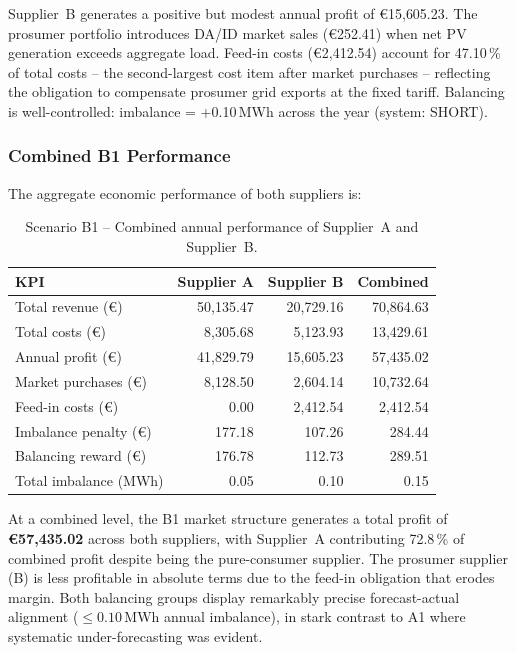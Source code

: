 Supplier~B generates a positive but modest annual profit of €15{,}605.23.
The prosumer portfolio introduces DA/ID market sales (€252.41) when net
PV generation exceeds aggregate load.  Feed-in costs (€2{,}412.54)
account for 47.10\,\% of total costs -- the second-largest cost item after
market purchases -- reflecting the obligation to compensate prosumer
grid exports at the fixed tariff.  Balancing is well-controlled:
imbalance = +0.10\,MWh across the year (system: SHORT).

\subsubsection{Combined B1 Performance}

The aggregate economic performance of both suppliers is:

\begin{table}[htbp]
\centering
\caption{Scenario B1 -- Combined annual performance of Supplier~A and
         Supplier~B.}
\label{tab:B1_combined}
\renewcommand{\arraystretch}{1.3}
\begin{tabular}{@{}lrrr@{}}
\toprule
\textbf{KPI}           & \textbf{Supplier A}  & \textbf{Supplier B}  & \textbf{Combined} \\
\midrule
Total revenue (€)      & 50{,}135.47          & 20{,}729.16          & 70{,}864.63 \\
Total costs (€)        & 8{,}305.68           & 5{,}123.93           & 13{,}429.61 \\
Annual profit (€)      & 41{,}829.79          & 15{,}605.23          & 57{,}435.02 \\
Market purchases (€)   & 8{,}128.50           & 2{,}604.14           & 10{,}732.64 \\
Feed-in costs (€)      & 0.00                 & 2{,}412.54           & 2{,}412.54  \\
Imbalance penalty (€)  & 177.18               & 107.26               & 284.44      \\
Balancing reward (€)   & 176.78               & 112.73               & 289.51      \\
Total imbalance (MWh)  & 0.05                 & 0.10                 & 0.15        \\
\bottomrule
\end{tabular}
\end{table}

At a combined level, the B1 market structure generates a total profit of
\textbf{€57{,}435.02} across both suppliers, with Supplier~A contributing
72.8\,\% of combined profit despite being the pure-consumer supplier.  The
prosumer supplier (B) is less profitable in absolute terms due to the
feed-in obligation that erodes margin.  Both balancing groups display
remarkably precise forecast-actual alignment ($\leq 0.10$\,MWh annual
imbalance), in stark contrast to A1 where systematic under-forecasting was
evident.

